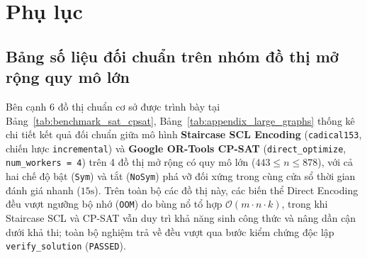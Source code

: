 \documentclass[a4paper,fleqn]{cas-sc}
\begin{document}
\appendix
\section{Phụ lục}
\label{sec:appendix}

\subsection{Bảng số liệu đối chuẩn trên nhóm đồ thị mở rộng quy mô lớn}
Bên cạnh 6 đồ thị chuẩn cơ sở được trình bày tại Bảng~\ref{tab:benchmark_sat_cpsat}, Bảng~\ref{tab:appendix_large_graphs} thống kê chi tiết kết quả đối chuẩn giữa mô hình \textbf{Staircase SCL Encoding} (\texttt{cadical153}, chiến lược \texttt{incremental}) và \textbf{Google OR-Tools CP-SAT} (\texttt{direct\_optimize}, \texttt{num\_workers = 4}) trên 4 đồ thị mở rộng có quy mô lớn ($443 \le n \le 878$), với cả hai chế độ bật (\texttt{Sym}) và tắt (\texttt{NoSym}) phá vỡ đối xứng trong cùng cửa sổ thời gian đánh giá nhanh ($15\text{s}$). Trên toàn bộ các đồ thị này, các biến thể Direct Encoding đều vượt ngưỡng bộ nhớ (\texttt{OOM}) do bùng nổ tổ hợp $\mathcal{O}(m \cdot n \cdot k)$, trong khi Staircase SCL và CP-SAT vẫn duy trì khả năng sinh công thức và nâng dần cận dưới khả thi; toàn bộ nghiệm trả về đều vượt qua bước kiểm chứng độc lập \texttt{verify\_solution} (\texttt{PASSED}).
\end{document}
